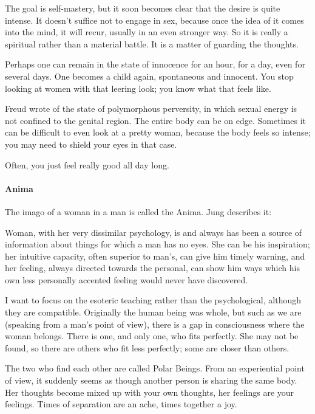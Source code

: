 The goal is self-mastery, but it soon becomes clear that the desire is quite intense. It doesn't suffice not to engage in sex, because once the idea of it comes into the mind, it will recur, usually in an even stronger way. So it is really a spiritual rather than a material battle. It is a matter of guarding the thoughts.

Perhaps one can remain in the state of innocence for an hour, for a day, even for several days. One becomes a child again, spontaneous and innocent. You stop looking at women with that leering look; you know what that feels like.

Freud wrote of the state of polymorphous perversity, in which sexual energy is not confined to the genital region. The entire body can be on edge. Sometimes it can be difficult to even look at a pretty woman, because the body feels so intense; you may need to shield your eyes in that case.

Often, you just feel really good all day long.

\paragraph{Anima}
The imago of a woman in a man is called the Anima. Jung describes it:

\begin{quotex}
Woman, with her very dissimilar psychology, is and always has been a source of information about things for which a man has no eyes. She can be his inspiration; her intuitive capacity, often superior to man's, can give him timely warning, and her feeling, always directed towards the personal, can show him ways which his own less personally accented feeling would never have discovered. 

\end{quotex}
I want to focus on the esoteric teaching rather than the psychological, although they are compatible. Originally the human being was whole, but such as we are (speaking from a man's point of view), there is a gap in consciousness where the woman belongs. There is one, and only one, who fits perfectly. She may not be found, so there are others who fit less perfectly; some are closer than others.

The two who find each other are called Polar Beings. From an experiential point of view, it suddenly seems as though another person is sharing the same body. Her thoughts become mixed up with your own thoughts, her feelings are your feelings. Times of separation are an ache, times together a joy.

